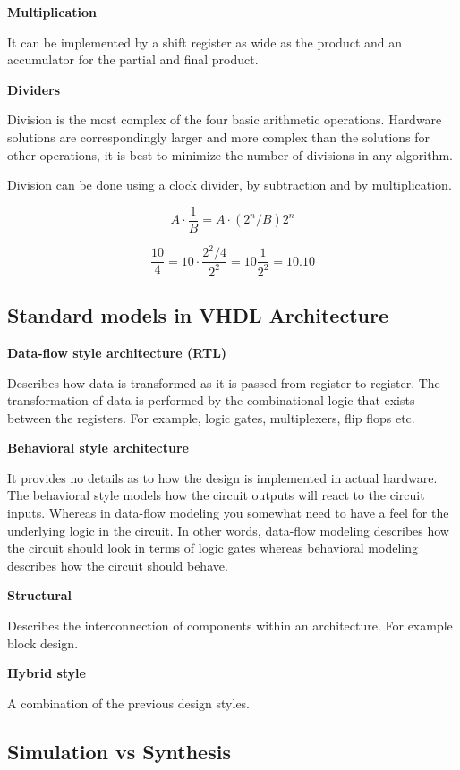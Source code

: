 \textbf{Multiplication}

It can be implemented by a shift register as wide as the product
and an accumulator for the partial and final product.



\textbf{Dividers}

Division is the most complex of the four basic arithmetic operations.
Hardware solutions are correspondingly larger and more complex
than the solutions for other operations, it is best to minimize the
number of divisions in any algorithm.

Division can be done using a clock divider, by subtraction
and by multiplication.

$$ A \cdot \frac{1}{B} = A \cdot (2^n/B)2^n$$

$$ \frac{10}{4} = 10 \cdot \frac{2^2/4}{2^2} = 10 \frac{1}{2^2} = 10.10$$




\subsection{Standard models in VHDL Architecture}


\textbf{Data-flow style architecture (RTL)}

Describes how data is transformed as it is passed from register to register.
The transformation of data is performed by the combinational logic
that exists between the registers. For example, logic gates, multiplexers,
flip flops etc.


\textbf{Behavioral style architecture}

It provides no details as to how the design is implemented in actual hardware.
The behavioral style models how the circuit outputs will react to the circuit inputs.
Whereas in data-flow modeling you somewhat need to have a feel for the underlying logic in the circuit.
In other words, data-flow modeling describes how the circuit should look in terms of logic gates
whereas behavioral modeling describes how the circuit should behave.

\textbf{Structural}

Describes the interconnection of components within an architecture.
For example block design.

\textbf{Hybrid style}

A combination of the previous design styles.


\subsection{Simulation vs Synthesis}

